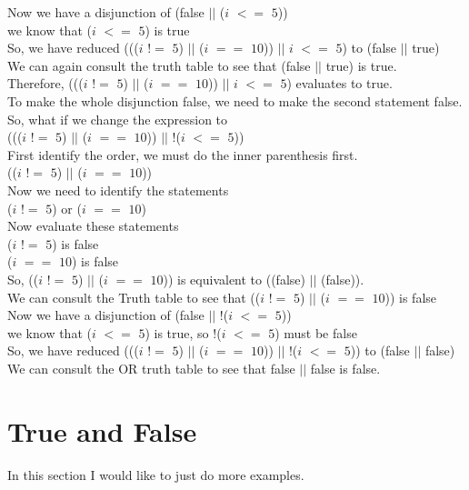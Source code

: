 \documentclass[11]{article}
\begin{document}
 Now we have a disjunction of (false $||$ ($i$ $<=$ $5$))\\
 we know that ($i$ $<=$ $5$) is true \\
 So, we have reduced ((($i$ $!=$ $5$) $||$ ($i$ $==$ $10$)) $||$ $i$ $<=$ $5$) to (false $||$ true)\\
 We can again consult the truth table to see that (false $||$ true) is true.\\
 
 Therefore, ((($i$ $!=$ $5$) $||$ ($i$ $==$ $10$)) $||$ $i$ $<=$ $5$) evaluates to true.\\
 
 To make the whole disjunction false, we need to make the second statement false. So, what if we change the expression to \\
 ((($i$ $!=$ $5$) $||$ ($i$ $==$ $10$)) $||$ !($i$ $<=$ $5$))\\
 
 First identify the order, we must do the inner parenthesis first.\\
(($i$ $!=$ $5$) $||$ ($i$ $==$ $10$))\\
Now we need to identify the statements\\
($i$ $!=$ $5$) or ($i$ $==$ $10$) \\
Now evaluate these statements \\
($i$ $!=$ $5$) is false\\
 ($i$ $==$ $10$) is false \\
 So, (($i$ $!=$ $5$) $||$ ($i$ $==$ $10$)) is equivalent to ((false) $||$ (false)).\\
 We can consult the Truth table to see that (($i$ $!=$ $5$) $||$ ($i$ $==$ $10$)) is false\\
 
 Now we have a disjunction of (false $||$ !($i$ $<=$ $5$))\\
 we know that ($i$ $<=$ $5$) is true, so   !($i$ $<=$ $5$) must be false\\
 So, we have reduced ((($i$ $!=$ $5$) $||$ ($i$ $==$ $10$)) $||$ !($i$ $<=$ $5$)) to (false $||$ false)\\
 
 We can consult the OR truth table to see that false $||$ false is false.

\section{True and False}
In this section I would like to just do more examples.\\
\end{document}
